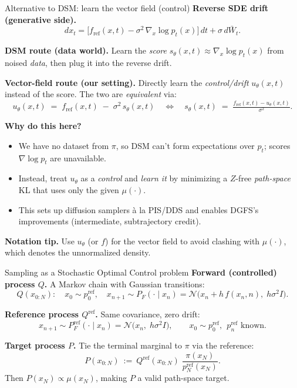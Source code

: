 \documentclass[aspectratio=169,xcolor=dvipsnames]{beamer}
\begin{document}
\begin{frame}[t]{Alternative to DSM: learn the vector field (control)}
\scriptsize
\textbf{Reverse SDE drift (generative side).}
\[
dx_t=\big[f_{\text{ref}}(x,t)-\sigma^2\,\nabla_x \log p_t(x)\big]\,dt+\sigma\,d\bar W_t.
\]

\textbf{DSM route (data world).} Learn the \emph{score} $s_\theta(x,t)\approx\nabla_x\log p_t(x)$ from noised \emph{data}, then plug it into the reverse drift.

\textbf{Vector-field route (our setting).} Directly learn the \emph{control/drift} $u_\theta(x,t)$ instead of the score. The two are \emph{equivalent} via:
\[
u_\theta(x,t)\;=\;f_{\text{ref}}(x,t)\;-\;\sigma^2\,s_\theta(x,t)
\quad\Longleftrightarrow\quad
s_\theta(x,t)\;=\;\tfrac{f_{\text{ref}}(x,t)-u_\theta(x,t)}{\sigma^2}.
\]

\textbf{Why do this here?}
\begin{itemize}\itemsep2pt
  \item We have no dataset from $\pi$, so DSM can’t form expectations over $p_t$; scores $\nabla\log p_t$ are unavailable.
  \item Instead, treat $u_\theta$ as a \emph{control} and \emph{learn it} by minimizing a $Z$-free \textit{path-space} KL that uses only the given $\mu(\cdot)$.
  \item This sets up diffusion samplers à la PIS/DDS and enables DGFS’s improvements (intermediate, subtrajectory credit).
\end{itemize}

\textbf{Notation tip.} Use $u_\theta$ (or $f$) for the vector field to avoid clashing with $\mu(\cdot)$, which denotes the unnormalized density.
\end{frame}




\begin{frame}[t]{Sampling as a Stochastic Optimal Control problem}
\footnotesize
\textbf{Forward (controlled) process $Q$.} A Markov chain with Gaussian transitions:
\[
Q(x_{0:N}):\quad x_0\sim p_0^{\text{ref}},\quad x_{n+1}\sim P_F(\cdot\mid x_n)=\mathcal N\!\big(x_n + h\,f(x_n,n),\; h\sigma^2 I\big).
\]

\textbf{Reference process $Q^{\text{ref}}$.} Same covariance, zero drift:
\[
x_{n+1}\sim P_F^{\text{ref}}(\cdot\mid x_n)=\mathcal N\!\big(x_n,\; h\sigma^2 I\big),\qquad x_0\sim p_0^{\text{ref}},\ \ p_n^{\text{ref}}\text{ known.}
\]

\textbf{Target process $P$.} Tie the terminal marginal to $\pi$ via the reference:
\[
P(x_{0:N})\ :=\ Q^{\text{ref}}(x_{0:N})\;\frac{\pi(x_N)}{p_N^{\text{ref}}(x_N)}.
\]
Then $P(x_N)\propto \mu(x_N)$, making $P$ a valid path-space target.
\end{frame}
\end{document}
